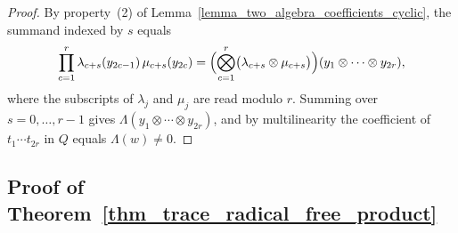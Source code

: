\begin{proof}
    By property~(2) of Lemma~\ref{lemma_two_algebra_coefficients_cyclic}, the summand indexed by \(s\) equals
    \[
        \prod_{c=1}^{r}\lambda_{c+s}(y_{2c-1})\,\mu_{c+s}(y_{2c})
        =\Bigl(\bigotimes_{c=1}^{r}\bigl(\lambda_{c+s}\otimes\mu_{c+s}\bigr)\Bigr)(y_1\otimes\cdots\otimes y_{2r}),
    \]
    where the subscripts of \(\lambda_j\) and \(\mu_j\) are read modulo \(r\). Summing over \(s=0,\ldots,r-1\) gives \(\Lambda(y_1\otimes\cdots\otimes y_{2r})\), and by multilinearity the coefficient of \(t_1\cdots t_{2r}\) in \(Q\) equals \(\Lambda(w)\neq0\).
\end{proof}

\subsection{Proof of Theorem~\ref{thm_trace_radical_free_product}}

